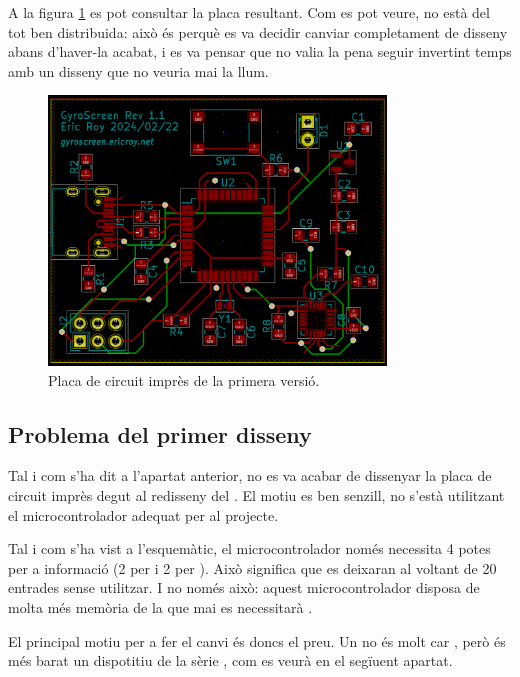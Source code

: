 A la figura \ref{fig:pcb_v1} es pot consultar la placa resultant. Com es pot veure,
no està del tot ben distribuida: això és perquè es va decidir canviar completament
de disseny abans d'haver-la acabat, i es va pensar que no valia la pena seguir
invertint temps amb un disseny que no veuria mai la llum.

\begin{figure}[ht]
    \centering
    \includegraphics[width=0.8\textwidth]{images/kicad/gyro1_pcb.png}
    \caption{Placa de circuit imprès de la primera versió.}
    \label{fig:pcb_v1}
\end{figure}

\subsection{Problema del primer disseny}

Tal i com s'ha dit a l'apartat anterior, no es va acabar de dissenyar la placa
de circuit imprès degut al redisseny del . El motiu es ben senzill,
no s'està utilitzant el microcontrolador adequat per al projecte.

Tal i com s'ha vist a l'esquemàtic, el microcontrolador només necessita 4 potes
per a informació (2 per  i 2 per ). Això significa que es
deixaran al voltant de 20 entrades sense utilitzar. I no només això: aquest
microcontrolador disposa de molta més memòria de la que mai es necessitarà
\cite{AtMega32u4}.

El principal motiu per a fer el canvi és doncs el preu. Un 
no és molt car \cite{AvrComparison}, però és més barat un dispotitiu  de la sèrie
, com es veurà en el segïuent apartat.

